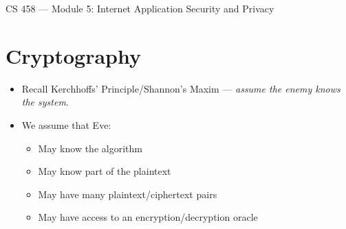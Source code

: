 \documentclass{article}
\author{Clement Tsang}
\begin{document}
\begin{center}
    \Large{CS 458 --- Module 5: Internet Application Security and Privacy}
\end{center}

\section{Cryptography}
\begin{itemize}
    \item Recall Kerchhoffs' Principle/Shannon's Maxim --- \emph{assume the enemy knows the system}.
    \item We assume that Eve:
        \begin{itemize}
            \item May know the algorithm
            \item May know part of the plaintext
            \item May have many plaintext/ciphertext pairs
            \item May have access to an encryption/decryption oracle
        \end{itemize}
\end{itemize}
\end{document}
